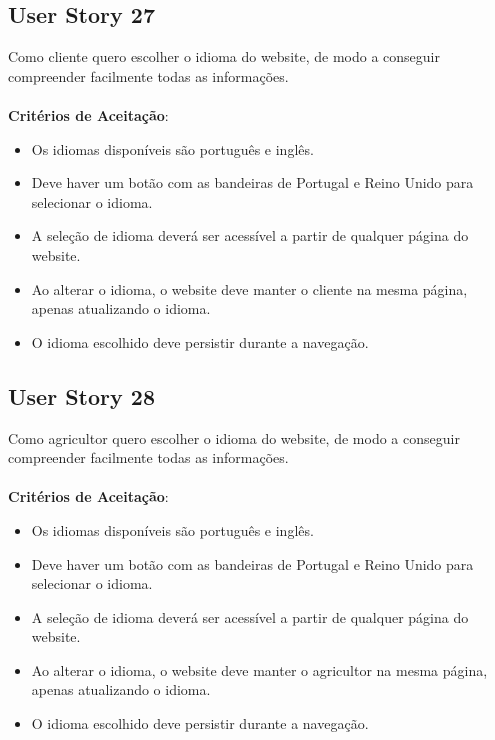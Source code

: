 \documentclass[a4paper,11pt]{article}
\begin{document}
\subsection{User Story 27}
Como cliente quero escolher o idioma do website, de modo a conseguir compreender facilmente todas as informações.\\\\
\textbf{Critérios de Aceitação}:
\begin{itemize}
  \item Os idiomas disponíveis são português e inglês.
  \item Deve haver um botão com as bandeiras de Portugal e Reino Unido para selecionar o idioma.
  \item A seleção de idioma deverá ser acessível a partir de qualquer página do website.
  \item Ao alterar o idioma, o website deve manter o cliente na mesma página, apenas atualizando o idioma.
  \item O idioma escolhido deve persistir durante a navegação.
\end{itemize}
\subsection{User Story 28}
Como agricultor quero escolher o idioma do website, de modo a conseguir compreender facilmente todas as informações.\\\\
\textbf{Critérios de Aceitação}:
\begin{itemize}
  \item Os idiomas disponíveis são português e inglês.
  \item Deve haver um botão com as bandeiras de Portugal e Reino Unido para selecionar o idioma.
  \item A seleção de idioma deverá ser acessível a partir de qualquer página do website.
  \item Ao alterar o idioma, o website deve manter o agricultor na mesma página, apenas atualizando o idioma.
  \item O idioma escolhido deve persistir durante a navegação.
\end{itemize}
\end{document}
